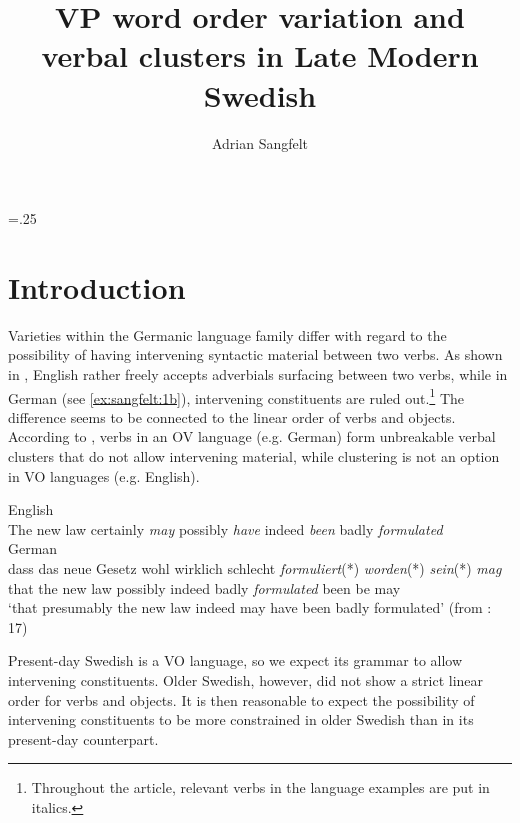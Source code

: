 \documentclass[output=paper, colorlinks, citecolor=brown]{langscibook}
\author{Adrian Sangfelt\orcid{}\affiliation{Uppsala University}}
\title{VP word order variation and verbal clusters in Late Modern Swedish}
\begin{document}
\multicolsep=.25\baselineskip
\maketitle 


\section{Introduction}\label{sec:sangfelt:1}

Varieties within the Germanic language family differ with regard to the possibility of having intervening syntactic material between two verbs. As shown in , English rather freely accepts adverbials surfacing between two verbs, while in German (see \ref{ex:sangfelt:1b}), intervening constituents are ruled out.\footnote{Throughout the article, relevant verbs in the language examples are put in italics.} The difference seems to be connected to the linear order of verbs and objects. According to \citet[17–19, 33–35, 287–293]{Haider2010}, verbs in an OV language (e.g. German) form unbreakable verbal clusters that do not allow intervening material, while clustering is not an option in VO languages (e.g. English).

\ea
\label{ex:sangfelt:1}
\ea English\label{ex:sangfelt:1a}\\
The new law {certainly} \textit{may} {possibly} \textit{have} {indeed} \textit{been} {badly} \textit{formulated} \\
\ex German\label{ex:sangfelt:1b}\\
\gll dass das neue Gesetz {wohl} {wirklich} {schlecht} \textit{formuliert}(*) \textit{worden}(*) \textit{sein}(*) \textit{mag} \\
that the new law possibly indeed badly \textit{formulated} been be may \\
\glt ‘that presumably the new law indeed may have been badly formulated’ (from \citealt{Haider2010}: 17)
\z
\z 


Present-day Swedish is a VO language, so we expect its grammar to allow intervening constituents. Older Swedish, however, did not show a strict linear order for verbs and objects. It is then reasonable to expect the possibility of intervening constituents to be more constrained in older Swedish than in its present-day counterpart.
\end{document}
